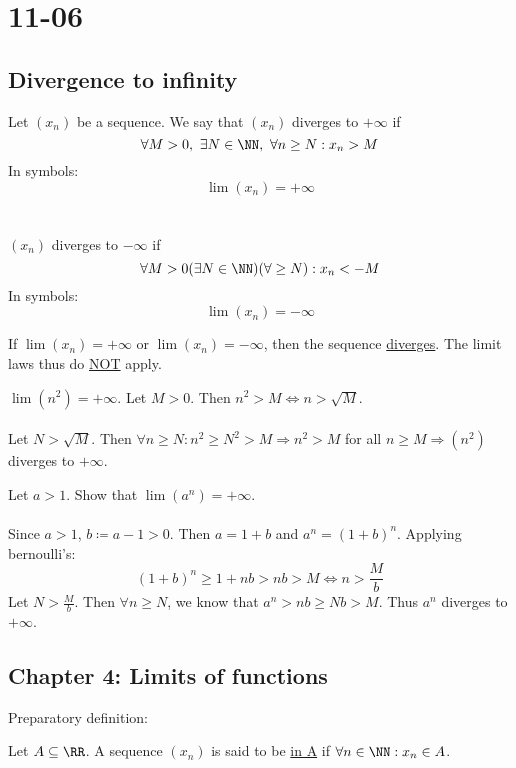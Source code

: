 \documentclass[class=scrartcl, crop=false]{standalone}
\date{2019-11-06}
\begin{document}
\section{11-06}

\subsection{Divergence to infinity}

\begin{definition}
  Let $(x_n)$ be a sequence. We say that $(x_n)$ diverges to $+ \infty$ if 
  \[\forall M > 0, \ \exists N \in \NN, \ \forall n \geq N : x_n > M\]
  In symbols:
  \[\lim(x_n) = +\infty\]
  \\\\
  $(x_n)$ diverges to $- \infty$ if 
  \[\forall M > 0 (\exists N \in \NN)(\forall \geq N):x_n < -M\]
  In symbols: 
  \[\lim(x_n) = -\infty\]
\end{definition} 
\begin{remark}
  If $\lim(x_n) = + \infty$ or $\lim(x_n) = -\infty$, then the sequence \ul{diverges}. The limit laws thus do \ul{NOT} apply.
\end{remark} 
\begin{example}
  $\lim(n^2) = + \infty$. Let $M > 0$. Then $n^2 > M \Leftrightarrow n > \sqrt{M}$.
  \\\\
  Let $N > \sqrt{M}$. Then $\forall n \geq N: n^2 \geq N^2 > M \Rightarrow n^2 > M$ for all $n \geq M \Rightarrow (n^2)$ diverges to $+\infty$.
\end{example} 
\begin{example}
  Let  $a > 1$. Show that $\lim(a^n) = + \infty$.
  \\\\
  Since $a > 1$, $b \coloneqq a - 1 > 0$. Then $a = 1 + b$ and $a^n = (1 + b)^n$. Applying bernoulli's:
  \[
    (1 + b)^n \geq 1 + nb > nb > M \Leftrightarrow n > \frac{M}{b}
  \]
  Let $N > \frac{M}{b}$. Then $\forall n \geq N$, we know that $a^n > nb \geq Nb > M$. Thus $a^n$ diverges to $+\infty$.
\end{example} 

\subsection{Chapter 4: Limits of functions}

Preparatory definition:
\begin{definition}[In $A$]
  Let $A \subseteq \RR$. A sequence $(x_n)$ is said to be \ul{in A} if $\forall n \in \NN : x_n \in A$.
\end{definition} 
\end{document}
